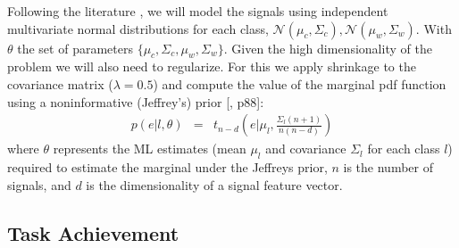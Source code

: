 Following the literature \cite{blankertz2010single}, we will model the signals using independent multivariate normal distributions for each class, $\mathcal{N}(\mu_c, \Sigma_c), \mathcal{N}(\mu_w, \Sigma_w)$. With $\theta$ the set of parameters $\{\mu_c, \Sigma_c,\mu_w, \Sigma_w\}$. Given the high dimensionality of the problem we will also need to regularize. For this we apply shrinkage to the covariance matrix ($\lambda = 0.5$) and compute the value of the marginal pdf function using a noninformative (Jeffrey’s) prior [\cite{gelman2003bayesian}, p88]:
%
\begin{eqnarray}
p(e|l, \theta) & = & t_{n-d}(e | \mu_l,\frac{\Sigma_l (n+1)}{n(n-d)})
\label{eq:prior}
\end{eqnarray}
where $\theta$ represents the ML estimates (mean $\mu_l$ and covariance $\Sigma_l$ for each class $l$) required to estimate the marginal under the Jeffreys prior, $n$ is the number of signals, and $d$ is the dimensionality of a signal feature vector.







\subsection{Task Achievement}

